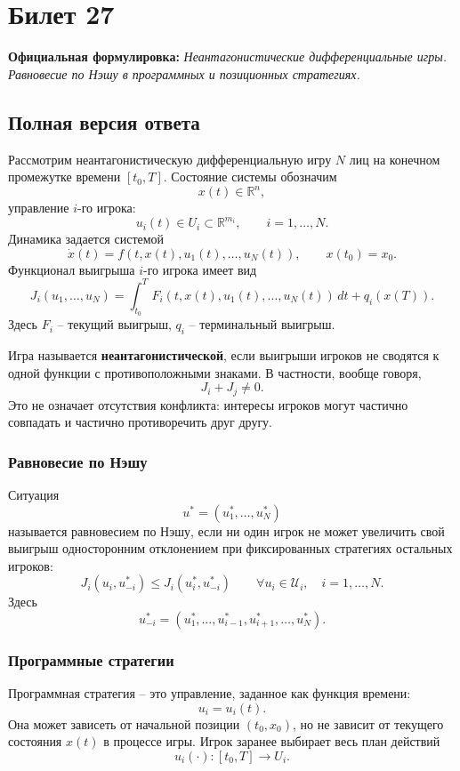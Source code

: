 \documentclass[12pt,a4paper]{article}
\newcommand{\R}{\mathbb{R}}
\begin{document}
\section{Билет 27}

\textbf{Официальная формулировка:} \emph{Неантагонистические дифференциальные игры. Равновесие по Нэшу в программных и позиционных стратегиях.}

\subsection{Полная версия ответа}

Рассмотрим неантагонистическую дифференциальную игру $N$ лиц на конечном промежутке времени $[t_0,T]$. Состояние системы обозначим
\[
 x(t)\in\R^n,
\]
управление $i$-го игрока:
\[
 u_i(t)\in U_i\subset\R^{m_i},\qquad i=1,\ldots,N.
\]
Динамика задается системой
\[
 \dot x(t)=f(t,x(t),u_1(t),\ldots,u_N(t)),\qquad x(t_0)=x_0.
\]
Функционал выигрыша $i$-го игрока имеет вид
\[
 J_i(u_1,\ldots,u_N)=\int_{t_0}^{T}F_i(t,x(t),u_1(t),\ldots,u_N(t))\,dt+q_i(x(T)).
\]
Здесь $F_i$ -- текущий выигрыш, $q_i$ -- терминальный выигрыш.

Игра называется \textbf{неантагонистической}, если выигрыши игроков не сводятся к одной функции с противоположными знаками. В частности, вообще говоря,
\[
 J_i+J_j\ne0.
\]
Это не означает отсутствия конфликта: интересы игроков могут частично совпадать и частично противоречить друг другу.

\subsubsection{Равновесие по Нэшу}

Ситуация
\[
 u^*=(u_1^*,\ldots,u_N^*)
\]
называется равновесием по Нэшу, если ни один игрок не может увеличить свой выигрыш односторонним отклонением при фиксированных стратегиях остальных игроков:
\[
 J_i(u_i,u_{-i}^*)\le J_i(u_i^*,u_{-i}^*)
 \qquad \forall u_i\in\mathcal U_i,\quad i=1,\ldots,N.
\]
Здесь
\[
 u_{-i}^*=(u_1^*,\ldots,u_{i-1}^*,u_{i+1}^*,\ldots,u_N^*).
\]

\subsubsection{Программные стратегии}

Программная стратегия -- это управление, заданное как функция времени:
\[
 u_i=u_i(t).
\]
Она может зависеть от начальной позиции $(t_0,x_0)$, но не зависит от текущего состояния $x(t)$ в процессе игры. Игрок заранее выбирает весь план действий
\[
 u_i(\cdot):[t_0,T]\to U_i.
\]
\end{document}
